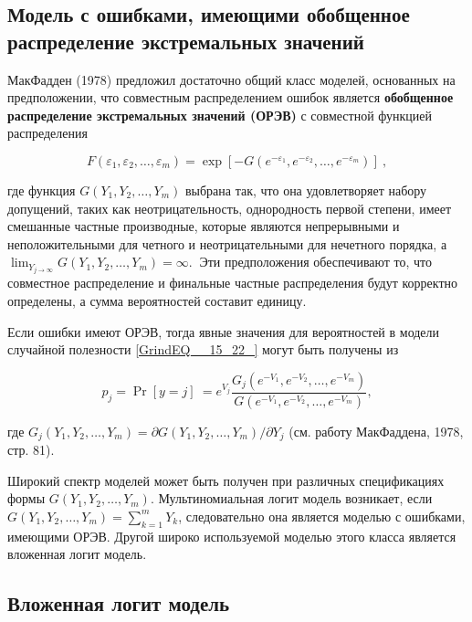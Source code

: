 \subsection{Модель с ошибками, имеющими обобщенное распределение экстремальных значений}

МакФадден (1978) предложил достаточно общий класс моделей, основанных на предположении, что совместным распределением ошибок является \textbf{обобщенное распределение экстремальных значений (ОРЭВ) } с совместной функцией распределения 

\begin{equation} 
\label{GrindEQ__15_30_} 
F\left({\varepsilon }_1,{\varepsilon }_2,\dots ,{\varepsilon }_m\right)={\exp  \left[-G\left(e^{-{\varepsilon }_1},e^{-{\varepsilon }_2},\dots ,e^{-{\varepsilon }_m}\right)\right]\ }, 
\end{equation} 

где функция $G(Y_1,Y_2,\dots ,Y_m)$ выбрана так, что она удовлетворяет набору допущений, таких как неотрицательность, однородность первой степени, имеет смешанные частные производные, которые являются непрерывными и неположительными для четного и неотрицательными для нечетного порядка, а ${\mathop{\lim }_{Y_{j\to \infty }} G\left(Y_1,Y_2,\dots ,Y_m\right)=\infty .\ }$ Эти предположения обеспечивают то, что совместное распределение и финальные частные распределения будут корректно определены, а сумма вероятностей составит единицу. 

Если ошибки имеют ОРЭВ, тогда явные значения для вероятностей в модели случайной полезности \eqref{GrindEQ__15_22_} могут быть получены из

\begin{equation} \label{GrindEQ__15_31_} p_j={\Pr  \left[y=j\right]\ }=e^{V_j}\frac{G_j(e^{-V_1},e^{-V_2},\dots ,e^{-V_m})}{G(e^{-V_1},e^{-V_2},\dots ,e^{-V_m})}, \end{equation} 

где $G_j\left(Y_1,Y_2,\dots ,Y_m\right)={\partial G(Y_1,Y_2,\dots ,Y_m)}/{\partial }Y_j$ (см. работу МакФаддена, 1978, стр. 81).

Широкий спектр моделей может быть получен при различных спецификациях формы $G\left(Y_1,Y_2,\dots ,Y_m\right).$ Мультиномиальная логит модель возникает, если $G\left(Y_1,Y_2,\dots ,Y_m\right)=\sum^m_{k=1}{Y_k}$, следовательно она является моделью с ошибками, имеющими ОРЭВ. Другой широко используемой моделью этого класса является вложенная логит модель.

\subsection{Вложенная логит модель}

